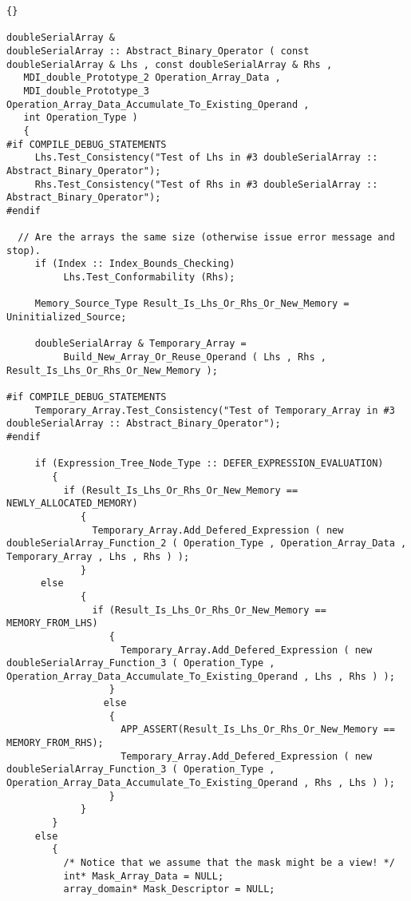 \documentclass[10pt]{llncs}
\begin{document}
\vspace{0.5in}

\begin{lstlisting}{}

doubleSerialArray &
doubleSerialArray :: Abstract_Binary_Operator ( const doubleSerialArray & Lhs , const doubleSerialArray & Rhs ,
   MDI_double_Prototype_2 Operation_Array_Data ,
   MDI_double_Prototype_3 Operation_Array_Data_Accumulate_To_Existing_Operand ,
   int Operation_Type )
   { 
#if COMPILE_DEBUG_STATEMENTS
     Lhs.Test_Consistency("Test of Lhs in #3 doubleSerialArray :: Abstract_Binary_Operator");
     Rhs.Test_Consistency("Test of Rhs in #3 doubleSerialArray :: Abstract_Binary_Operator");
#endif
 
  // Are the arrays the same size (otherwise issue error message and stop).
     if (Index :: Index_Bounds_Checking)
          Lhs.Test_Conformability (Rhs);

     Memory_Source_Type Result_Is_Lhs_Or_Rhs_Or_New_Memory = Uninitialized_Source;

     doubleSerialArray & Temporary_Array = 
          Build_New_Array_Or_Reuse_Operand ( Lhs , Rhs , Result_Is_Lhs_Or_Rhs_Or_New_Memory );

#if COMPILE_DEBUG_STATEMENTS
     Temporary_Array.Test_Consistency("Test of Temporary_Array in #3 doubleSerialArray :: Abstract_Binary_Operator");
#endif

     if (Expression_Tree_Node_Type :: DEFER_EXPRESSION_EVALUATION)
        {
          if (Result_Is_Lhs_Or_Rhs_Or_New_Memory == NEWLY_ALLOCATED_MEMORY) 
             {
               Temporary_Array.Add_Defered_Expression ( new doubleSerialArray_Function_2 ( Operation_Type , Operation_Array_Data , Temporary_Array , Lhs , Rhs ) );
             }
	  else
             {
               if (Result_Is_Lhs_Or_Rhs_Or_New_Memory == MEMORY_FROM_LHS) 
                  {
                    Temporary_Array.Add_Defered_Expression ( new doubleSerialArray_Function_3 ( Operation_Type , Operation_Array_Data_Accumulate_To_Existing_Operand , Lhs , Rhs ) );
                  }
                 else
                  {
                    APP_ASSERT(Result_Is_Lhs_Or_Rhs_Or_New_Memory == MEMORY_FROM_RHS); 
                    Temporary_Array.Add_Defered_Expression ( new doubleSerialArray_Function_3 ( Operation_Type , Operation_Array_Data_Accumulate_To_Existing_Operand , Rhs , Lhs ) );
                  }
             }
        }
     else
        {
          /* Notice that we assume that the mask might be a view! */
          int* Mask_Array_Data = NULL;
          array_domain* Mask_Descriptor = NULL;


\end{lstlisting}
\end{document}
